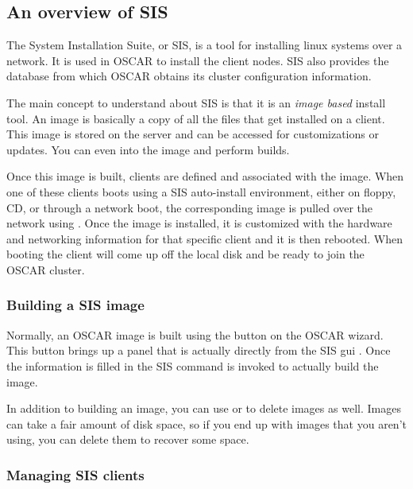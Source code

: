 %
%
%

\subsection{An overview of SIS}
\label{app:sis-overview}

The System Installation Suite, or SIS, is a tool for installing 
linux systems over a network. It is used in OSCAR to install the
client nodes. SIS also provides the database from which OSCAR
obtains its cluster configuration information.

The main concept to understand about SIS is that it is an
\emph{image based} install tool. An image is basically a copy
of all the files that get installed on a client. This image
is stored on the server and can be accessed for customizations or
updates. You can even  into the image and perform builds.

Once this image is built, clients are defined and associated with the
image. When one of these clients boots using a SIS auto-install
environment, either on floppy, CD, or through a network boot, the
corresponding image is pulled over the network using . 
Once the image is installed, it is customized with the hardware and
networking information for that specific client and it is then rebooted.
When booting the client will come up off the local disk and be ready
to join the OSCAR cluster.

\subsubsection{Building a SIS image}

Normally, an OSCAR image is built using the  
button on the OSCAR wizard. This button brings up a panel that is actually 
directly from the SIS gui . Once the information is filled in 
the SIS command  is invoked to actually build the image. 

In addition to building an image, you can use  or 
to delete images as well. Images can take a fair amount of disk space, so if
you end up with images that you aren't using, you can delete them to recover 
some space.

\subsubsection{Managing SIS clients}

